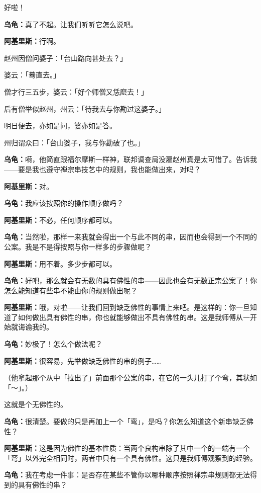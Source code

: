 \documentclass[
  12pt,
  twoside,
  openright,
  oldfontcommands,
]{memoir}
\newcommand{\dialogname}[1]{{\heifamily\bfseries #1}}
\begin{document}
好啦！

\dialogname{乌龟：}真了不起。让我们听听它怎么说吧。

\dialogname{阿基里斯：}行啊。

赵州因僧问婆子：「台山路向甚处去？」

婆云：「蓦直去。」

僧才行三五步，婆云：「好个师僧又恁麽去！」

后有僧举似赵州，州云：「待我去与你勘过这婆子。」

明日便去，亦如是问，婆亦如是答。

州归谓众曰：「台山婆子，我与你勘破了也。」

\dialogname{乌龟：}嗬，他简直跟福尔摩斯一样神，联邦调查局没雇赵州真是太可惜了。告诉我------要是我也遵守禅宗串技艺中的规则，我也能做出来，对吗？

\dialogname{阿基里斯：}对。

\dialogname{乌龟：}我应该按照你的操作顺序做吗？

\dialogname{阿基里斯：}不必，任何顺序都可以。

\dialogname{乌龟：}当然啦，那样一来我就会得出一个与此不同的串，因而也会得到一个不同的公案。我是不是得按照与你一样多的步骤做呢？

\dialogname{阿基里斯：}用不着。多少步都可以。

\dialogname{乌龟：}好吧，那么就会有无数的具有佛性的串------因此也会有无数正宗公案了！你怎么能知道有些串不能由你的规则做出呢？

\dialogname{阿基里斯：}哦，对啦------让我们回到缺乏佛性的事情上来吧。是这样的：你一旦知道了如何做出具有佛性的串，你也就能够做出不具有佛性的串。这是我师傅从一开始就诲谕我的。

\dialogname{乌龟：}妙极了！怎么个做法呢？

\dialogname{阿基里斯：}很容易，先举做缺乏佛性的串的例子\ldots\ldots{}

（他拿起那个从中「拉出了」前面那个公案的串，在它的一头儿打了个弯，其状如「～」。）

这就是个无佛性的。

\dialogname{乌龟：}很清楚。要做的只是再加上一个「弯」，是吗？你怎么知道这个新串缺乏佛性？

\dialogname{阿基里斯：}这是因为佛性的基本性质：当两个良构串除了其中一个的一端有一个「弯」以外完全相同时，两者中只有一个具有佛性。这只是我师傅观察到的经验。

\dialogname{乌龟：}我在考虑一件事：是否存在某些不管你以哪种顺序按照禅宗串规则都无法得到的具有佛性的串？
\end{document}
